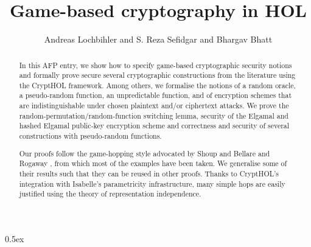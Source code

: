 \documentclass[11pt,a4paper]{article}
\theoremstyle{definition}
\begin{document}
\title{Game-based cryptography in HOL}
\author{Andreas Lochbihler and S. Reza Sefidgar and Bhargav Bhatt}
\maketitle

\begin{abstract}
  In this AFP entry, we show how to specify game-based cryptograph\-ic security notions and formally prove secure
  several cryptographic constructions from the literature using the CryptHOL framework.
  Among others, we formalise the notions of a random oracle, a pseudo-random function, an
  unpredictable function, and of encryption schemes that are indistinguishable under chosen plaintext
  and/or ciphertext attacks.
  We prove the random-permutation/random-function switching lemma, security of the Elgamal
  and hashed Elgamal public-key encryption scheme and correctness and security of several
  constructions with pseu\-do-random functions.

  Our proofs follow the game-hopping style advocated by Shoup \cite{Shoup2004IACR} and Bellare and
  Rogaway \cite{BellareRogaway2006EUROCRYPT}, from which most of the examples have been taken.
  We generalise some of their results such that they can be reused in other proofs.
  Thanks to CryptHOL's integration with Isabelle's parametricity infrastructure, many simple hops
  are easily justified using the theory of representation independence.
\end{abstract}


\tableofcontents

\clearpage

\parindent 0pt\parskip 0.5ex





\end{document}
